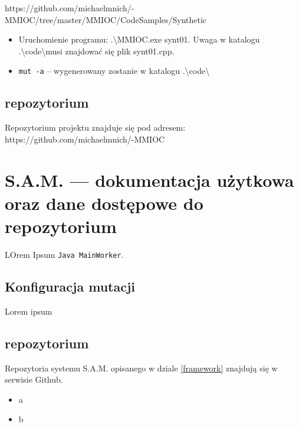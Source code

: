 \documentclass[11pt,a4paper,oldfontcommands]{memoir}
\theoremstyle{plain}
\theoremstyle{definition}
\theoremstyle{remark}
\begin{document}
\begin{appendices}
https://github.com/michaelmnich/-MMIOC/tree/master/MMIOC/CodeSamples/Synthetic

\begin{itemize}
\item Uruchomienie programu: .\textbackslash MMIOC.exe synt01. Uwaga w katalogu .\textbackslash  code\textbackslash musi znajdować się plik synt01.cpp.
\item \texttt{mut -a} -- wygenerowany zostanie w katalogu .\textbackslash code\textbackslash 


\end{itemize}

\section{repozytorium}

Repozytorium projektu znajduje się pod adresem: https://github.com/michaelmnich/-MMIOC



\chapter{S.A.M. — dokumentacja użytkowa oraz dane dostępowe do repozytorium} \label{manual}

LOrem Ipsum \texttt{Java MainWorker}.







\section{Konfiguracja mutacji}
Lorem ipsum \newline



\section{repozytorium}
Repozytoria systemu S.A.M. opisanego w dziale \ref{framework} znajdują się w serwisie Github. 
\begin{itemize}
\item a
\item b
\end{itemize}


\end{appendices}
\end{document}
